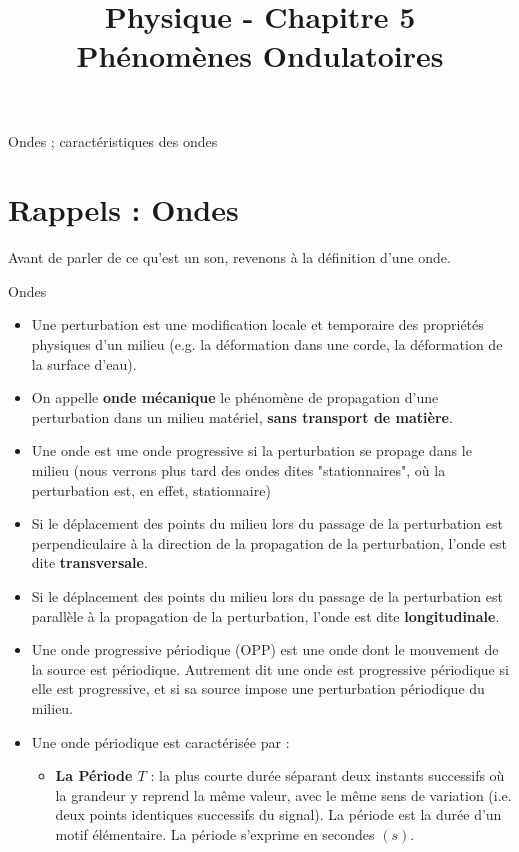 \documentclass[11pt,a4paper]{article}
\title{\large Physique - Chapitre 5 \\ \LARGE Phénomènes Ondulatoires}
\date{}
\author{}
\begin{document}
\maketitle
\vspace{-1cm}
\begin{tcolorbox}[title=Notions de la classe de première à rappeler]
Ondes ; caractéristiques des ondes 
\end{tcolorbox}
\tableofcontents
\newpage

\section{Rappels : Ondes}
Avant de parler de ce qu'est un son, revenons à la définition d'une onde. 

\begin{defn}{Ondes}
\begin{itemize}
    \item Une perturbation  est une modification locale  et temporaire des propriétés physiques d'un milieu (e.g. la déformation dans une corde, la déformation de la surface d'eau).
    \item On appelle \textbf{onde mécanique} le phénomène de propagation d'une perturbation dans un milieu matériel, \textbf{sans transport de matière}.
    \item Une onde est une onde progressive si la perturbation se propage dans le milieu (nous verrons plus tard des ondes dites "stationnaires", où la perturbation est, en effet, stationnaire)
    \item Si le déplacement des points du milieu lors du passage de la perturbation est perpendiculaire à la direction de la propagation de la perturbation, l'onde est dite \textbf{transversale}.
    \item Si le déplacement des points du milieu lors du passage de la perturbation est parallèle à la propagation de la perturbation, l'onde est dite \textbf{longitudinale}.
    \item Une onde progressive périodique (OPP) est une onde dont le mouvement de la source est périodique. Autrement dit une onde est progressive périodique si elle est progressive, et si sa source impose une perturbation  périodique du milieu. 
    \item Une onde périodique est caractérisée par : 
    \begin{itemize}
        \item \textbf{La Période $T$ }: la plus courte durée séparant deux instants successifs où la grandeur y reprend la même valeur, avec le même sens de variation (i.e. deux points identiques successifs du signal). La période est la durée d’un motif élémentaire. La période s’exprime en secondes $(s)$. 

\end{itemize}
\end{itemize}
\end{defn}
\end{document}
